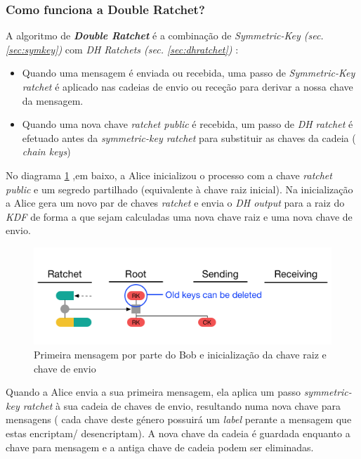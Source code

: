 \subsubsection{Como funciona a Double Ratchet?}
A algoritmo de \textit{\textbf{Double Ratchet}} é a combinação de \textit{Symmetric-Key (sec.\ref{sec:symkey})} com \textit{DH Ratchets (sec. \ref{sec:dhratchet})} :

\begin{itemize}
    \item Quando uma mensagem é enviada ou recebida, uma passo de \textit{Symmetric-Key ratchet} é aplicado nas cadeias de envio ou receção para derivar a nossa chave da mensagem.
    \item Quando uma nova chave \textit{ratchet public} é recebida, um passo de \textit{DH ratchet} é efetuado antes da \textit{symmetric-key ratchet} para substituir as chaves da cadeia ( \textit{chain keys})
\end{itemize}

No diagrama \ref{diagram:DR1} ,em baixo, a Alice inicializou o processo com a chave \textit{ratchet public} e um segredo partilhado (equivalente à chave raiz inicial). Na inicialização a Alice gera um novo par de chaves \textit{ratchet} e envia o \textit{DH output} para a raiz do \textit{KDF} de forma a que sejam calculadas uma nova chave raiz e uma nova chave de envio.

\begin{figure}[H]
\begin{center}
\includegraphics[width=12cm]{img/DR1.png}
\caption{Primeira mensagem por parte do Bob e inicialização da chave raiz e chave de envio}
\label{diagram:DR1}
\centering
\end{center}
\end{figure}

Quando a Alice envia a sua primeira mensagem, ela aplica um passo \textit{symmetric-key ratchet} à sua cadeia de chaves de envio, resultando numa nova chave para mensagens ( cada chave deste género possuirá um \textit{label} perante a mensagem que estas encriptam/ desencriptam). A nova chave da cadeia é guardada enquanto a chave para mensagem e a antiga chave de cadeia podem ser eliminadas.

